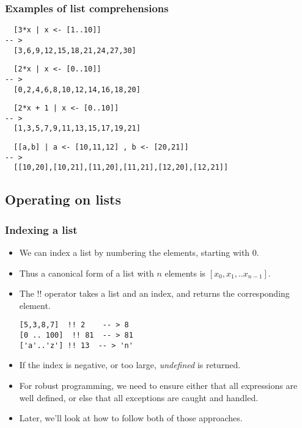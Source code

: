 \documentclass{beamer}
\begin{document}
\begin{frame}[fragile]
\frametitle{Examples of list comprehensions}

\begin{verbatim}
  [3*x | x <- [1..10]]
-- >
  [3,6,9,12,15,18,21,24,27,30]
\end{verbatim}

\begin{verbatim}
  [2*x | x <- [0..10]]
-- >
  [0,2,4,6,8,10,12,14,16,18,20]
\end{verbatim}

\begin{verbatim}
  [2*x + 1 | x <- [0..10]]
-- >
  [1,3,5,7,9,11,13,15,17,19,21]
\end{verbatim}

\begin{verbatim}
  [[a,b] | a <- [10,11,12] , b <- [20,21]]
-- >
  [[10,20],[10,21],[11,20],[11,21],[12,20],[12,21]]
\end{verbatim}

\end{frame}

\subsection{Operating on lists}

\begin{frame}[fragile]
\frametitle{Indexing a list}

\begin{itemize}
\item We can index a list by numbering the elements, starting with
  0.
\item Thus a canonical form of a list with $n$ elements is $[x_0,
  x_1, .. x_{n-1}]$.
\item The $!!$ operator takes a list and an index, and
  returns the corresponding element.
  \begin{verbatim}
[5,3,8,7]  !! 2    -- > 8
[0 .. 100]  !! 81  -- > 81
['a'..'z'] !! 13  -- > 'n'
  \end{verbatim}
\item If the index is negative, or too large, \emph{undefined} is returned.
\item For robust programming, we need to ensure either that all
  expressions are well defined, or else that all exceptions are
  caught and handled.
\item Later, we'll look at how to follow both of those approaches.
\end{itemize}

\end{frame}
\end{document}
